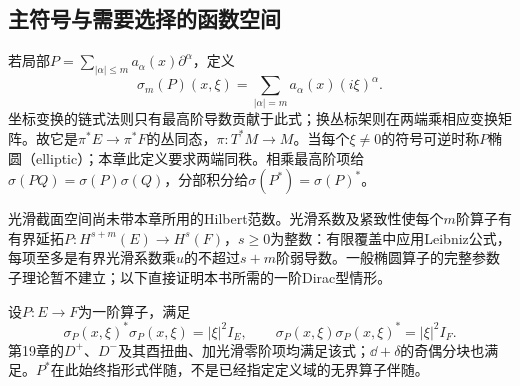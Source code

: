 \subsection{主符号与需要选择的函数空间}
若局部$P=\sum_{|\alpha|\leq m}a_\alpha(x)\partial^\alpha$，定义
\[
 \sigma_m(P)(x,\xi)=\sum_{|\alpha|=m}a_\alpha(x)(i\xi)^\alpha.
\]
坐标变换的链式法则只有最高阶导数贡献于此式；换丛标架则在两端乘相应变换矩阵。故它是$\pi^*E\to\pi^*F$的丛同态，$\pi:T^*M\to M$。当每个$\xi\ne0$的符号可逆时称$P$椭圆（elliptic）；本章此定义要求两端同秩。相乘最高阶项给$\sigma(PQ)=\sigma(P)\sigma(Q)$，分部积分给$\sigma(P^*)=\sigma(P)^*$。

光滑截面空间尚未带本章所用的Hilbert范数。光滑系数及紧致性使每个$m$阶算子有有界延拓$P:H^{s+m}(E)\to H^s(F)$，$s\geq0$为整数：有限覆盖中应用Leibniz公式，每项至多是有界光滑系数乘$u$的不超过$s+m$阶弱导数。一般椭圆算子的完整参数子理论暂不建立；以下直接证明本书所需的一阶Dirac型情形。

设$P:E\to F$为一阶算子，满足
\begin{equation}\label{eq:index-dirac-type}
 \sigma_P(x,\xi)^*\sigma_P(x,\xi)=|\xi|^2I_E,\qquad
 \sigma_P(x,\xi)\sigma_P(x,\xi)^*=|\xi|^2I_F.
\end{equation}
第19章的$D^+$、$D^-$及其酉扭曲、加光滑零阶项均满足该式；$\dd+\delta$的奇偶分块也满足。$P^*$在此始终指形式伴随，不是已经指定定义域的无界算子伴随。


